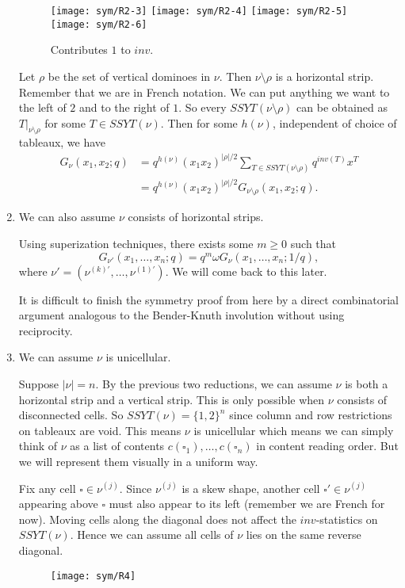 \begin{enumerate}[label=\textbf{(R\arabic*)}]
  \begin{figure}[H]
    \centering
    \texttt{[image: sym/R2-3]}
    \quad
    \texttt{[image: sym/R2-4]}
    \quad
    \texttt{[image: sym/R2-5]}
    \quad
    \texttt{[image: sym/R2-6]}
    \caption{Contributes $1$ to $inv$.}
  \end{figure}

  Let $\rho$ be the set of vertical dominoes in $\nu$.  Then
  $\nu \setminus \rho$ is a horizontal strip.  Remember that we are in French
  notation.  We can put anything we want to the left of $2$ and to the
  right of $1$.  So every $SSYT(\nu \setminus \rho)$ can be obtained as
  $T|_{\nu \setminus \rho}$ for some $T \in SSYT(\nu)$.  Then for some
  $h(\nu)$, independent of choice of tableaux, we have
  \begin{align*}
    G_{\nu}(x_{1},x_{2}; q)
    &= q^{h(\nu)}(x_{1}x_{2})^{|\rho|/2} \sum_{T \in SSYT(\nu \setminus \rho)} q^{inv(T)} x^{T} \\
    &= q^{h(\nu)}(x_{1}x_{2})^{|\rho|/2} G_{\nu \setminus \rho}(x_{1},x_{2}; q).
  \end{align*}

\item We can also assume $\nu$ consists of horizontal strips.

  Using superization techniques, there exists some $m \ge 0$ such that
  \[
    G_{\nu'}(x_{1},\dots,x_{n}; q) = q^{m} \omega G_{\nu}(x_{1}, \dots, x_{n}; 1/q),
  \]
  where $\nu' = (\nu^{(k)'}, \dots, \nu^{(1)'})$.  We will come back to this
  later.

  It is difficult to finish the symmetry proof from here by a direct
  combinatorial argument analogous to the Bender-Knuth involution
  without using reciprocity.

\item We can assume $\nu$ is unicellular.

  Suppose $|\nu| = n$.  By the previous two reductions, we can assume
  $\nu$ is both a horizontal strip and a vertical strip.  This is only
  possible when $\nu$ consists of disconnected cells.  So
  $SSYT(\nu) = \{1,2\}^{n}$ since column and row restrictions on tableaux
  are void.  This means $\nu$ is unicellular which means we can simply
  think of $\nu$ as a list of contents
  $c(\square_{1}), \dots, c(\square_{n})$ in content reading order.  But we will
  represent them visually in a uniform way.

  Fix any cell $\square \in \nu^{(j)}$.  Since $\nu^{(j)}$ is a skew shape,
  another cell $\square' \in \nu^{(j)}$ appearing above $\square$ must also appear to
  its left (remember we are French for now).  Moving cells along the
  diagonal does not affect the $inv$-statistics on $SSYT(\nu)$.  Hence
  we can assume all cells of $\nu$ lies on the same reverse diagonal.
  \begin{figure}[H]
    \centering
    \texttt{[image: sym/R4]}
  \end{figure}
\end{enumerate}

